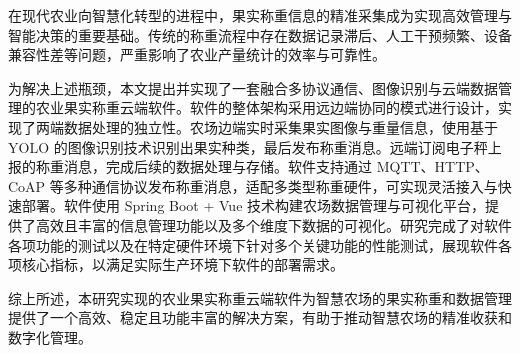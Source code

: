 在现代农业向智慧化转型的进程中，果实称重信息的精准采集成为实现高效管理与智能决策的重要基础。传统的称重流程中存在数据记录滞后、人工干预频繁、设备兼容性差等问题，严重影响了农业产量统计的效率与可靠性。

为解决上述瓶颈，本文提出并实现了一套融合多协议通信、图像识别与云端数据管理的农业果实称重云端软件。软件的整体架构采用远边端协同的模式进行设计，实现了两端数据处理的独立性。农场边端实时采集果实图像与重量信息，使用基于 YOLO 的图像识别技术识别出果实种类，最后发布称重消息。远端订阅电子秤上报的称重消息，完成后续的数据处理与存储。软件支持通过 MQTT、HTTP、CoAP 等多种通信协议发布称重消息，适配多类型称重硬件，可实现灵活接入与快速部署。软件使用 Spring Boot + Vue 技术构建农场数据管理与可视化平台，提供了高效且丰富的信息管理功能以及多个维度下数据的可视化。研究完成了对软件各项功能的测试以及在特定硬件环境下针对多个关键功能的性能测试，展现软件各项核心指标，以满足实际生产环境下软件的部署需求。

综上所述，本研究实现的农业果实称重云端软件为智慧农场的果实称重和数据管理提供了一个高效、稳定且功能丰富的解决方案，有助于推动智慧农场的精准收获和数字化管理。 
